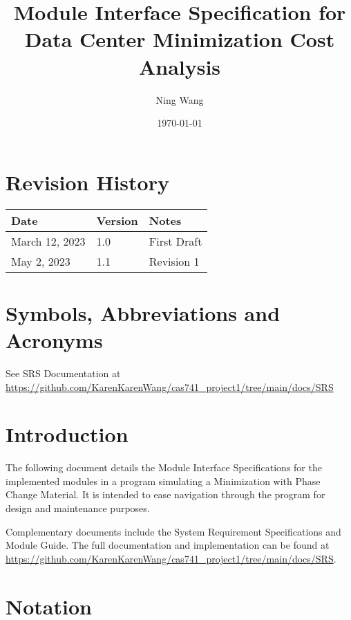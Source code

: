 \documentclass[12pt, titlepage]{article}
\begin{document}
\title{Module Interface Specification for Data Center Minimization Cost Analysis}

\author{Ning Wang}

\date{\today}

\maketitle


\newpage

\tableofcontents


\newpage
\section{Revision History}

\begin{tabularx}{\textwidth}{p{3cm}p{2cm}X}
\toprule {\bf Date} & {\bf Version} & {\bf Notes}\\
\midrule
March 12, 2023 & 1.0 & First Draft\\
May 2, 2023 & 1.1 & Revision 1\\
\bottomrule
\end{tabularx}

\newpage
\section{Symbols, Abbreviations and Acronyms}

    See SRS Documentation at \url{https://github.com/KarenKarenWang/cas741_project1/tree/main/docs/SRS}


\section{Introduction}

The following document details the Module Interface Specifications for the
implemented modules in a program simulating a Minimization with
Phase Change Material.  It is intended to ease navigation through the program
for design and maintenance purposes.

Complementary documents include the System Requirement Specifications
and Module Guide.  The full documentation and implementation can be
found at \url{https://github.com/KarenKarenWang/cas741_project1/tree/main/docs/SRS}.


\section{Notation}
\end{document}
